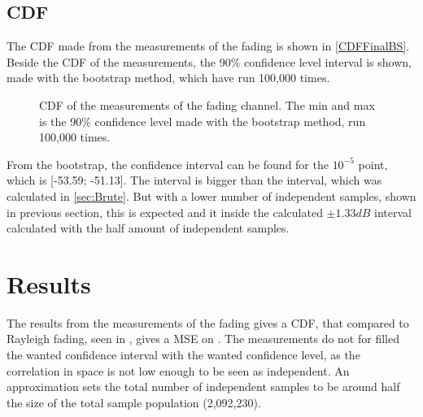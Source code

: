 \subsection{CDF}
The CDF made from the measurements of the fading is shown in \autoref{CDFFinalBS}. Beside the CDF of the measurements, the 90\% confidence level interval is shown, made with the bootstrap method, which have run 100,000 times.

\begin{figure}[H]

\caption{CDF of the measurements of the fading channel. The min and max is the 90\% confidence level made with the bootstrap method, run 100,000 times.}
\label{CDFFinalBS}
\end{figure}

From the bootstrap, the confidence interval can be found for the $10^{-5}$ point, which is [-53.59; -51.13]. The interval is bigger than the interval, which was calculated in \autoref{sec:Brute}. But with a lower number of independent samples, shown in previous section, this is expected and it inside the calculated $\pm 1.33dB$ interval calculated with the half amount of independent samples.


\section{Results}
The results from the measurements of the fading gives a CDF, that compared to Rayleigh fading, seen in , gives a MSE on . The measurements do not for filled the wanted confidence interval with the wanted confidence level, as the correlation in space is not low enough to be seen as independent. An approximation sets the total number of independent samples to be around half the size of the total sample population (2,092,230).








